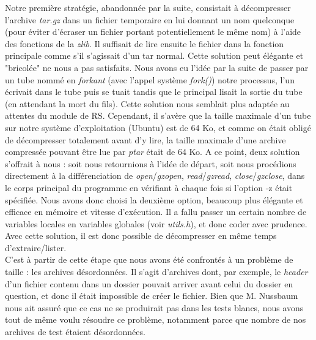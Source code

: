\documentclass[12pt, a4paper]{report}
\begin{document}
\hspace{0.5cm}Notre première stratégie, abandonnée par la suite, consistait à décompresser l'archive \textit{tar.gz} dans un fichier temporaire en lui donnant un nom quelconque (pour éviter d'écraser un fichier portant potentiellement le même nom) à l'aide des fonctions de la \textit{zlib}. Il suffisait de lire ensuite le fichier dans la fonction principale comme s'il s'agissait d'un tar normal. Cette solution peut élégante et "bricolée" ne nous a pas satisfaits. Nous avons eu l'idée par la suite de passer par un tube nommé en \textit{forkant} (avec l'appel système \textit{fork()}) notre processus, l'un écrivait dans le tube puis se tuait tandis que le principal lisait la sortie du tube (en attendant la mort du fils). Cette solution nous semblait plus adaptée au attentes du module de RS. Cependant, il s'avère que la taille maximale d'un tube sur notre système d'exploitation (Ubuntu) est de 64 Ko, et comme on était obligé de décompresser totalement avant d'y lire, la taille maximale d'une archive compressée pouvant être lue par \textit{ptar} était de 64 Ko. 
A ce point, deux solution s'offrait à nous : soit nous retournions à l'idée de départ, soit nous procédions directement à la différenciation de \textit{open}/\textit{gzopen}, \textit{read}/\textit{gzread}, \textit{close}/\textit{gzclose}, dans le corps principal du programme en vérifiant à chaque fois si l'option -z était spécifiée. Nous avons donc choisi la deuxième option, beaucoup plus élégante et efficace en mémoire et vitesse d'exécution. Il a fallu passer un certain nombre de variables locales en variables globales (voir \textit{utils.h}), et donc coder avec prudence. Avec cette solution, il est donc possible de décompresser en même temps d'extraire/lister.\\

\hspace{0.5cm}C'est à partir de cette étape que nous avons été confrontés à un problème de taille : les archives désordonnées. Il s'agit d'archives dont, par exemple, le \textit{header} d'un fichier contenu dans un dossier pouvait arriver avant celui du dossier en question, et donc il était impossible de créer le fichier. Bien que M. Nussbaum nous ait assuré que ce cas ne se produirait pas dans les tests blancs, nous avons tout de même voulu résoudre ce problème, notamment parce que nombre de nos archives de test étaient désordonnées.\\
\end{document}
